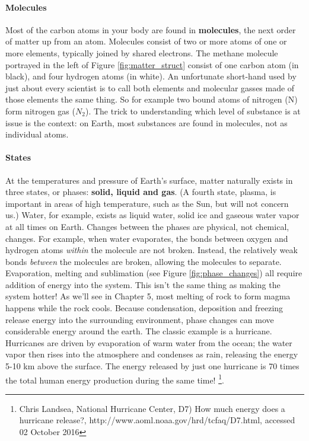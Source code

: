 \documentclass[amstex,12pt]{book}
\begin{document}
\paragraph{Molecules}
Most of the carbon atoms in your body are found in \textbf{molecules}, the next order of matter up from an atom. Molecules consist of two or more atoms of one or more elements, typically joined by shared electrons. The methane molecule portrayed in the left of Figure \ref{fig:matter_struct} consist of one carbon atom (in black), and four hydrogen atoms (in white). An unfortunate short-hand used by just about every scientist is to call both elements and molecular gasses made of those elements the same thing. So for example two bound atoms of nitrogen (N) form nitrogen gas ($N_{2}$). The trick to understanding which level of substance is at issue is the context: on Earth, most substances are found in molecules, not as individual atoms.

\paragraph{States}
At the temperatures and pressure of Earth's surface, matter naturally exists in three states, or phases: \textbf{solid, liquid and gas}. (A fourth state, plasma, is important in areas of high temperature, such as the Sun, but will not concern us.) Water, for example, exists as liquid water, solid ice and gaseous water vapor at all times on Earth. Changes between the phases are physical, not chemical, changes. For example, when water evaporates, the bonds between oxygen and hydrogen atoms \emph{within} the molecule are not broken. Instead, the relatively weak bonds \emph{between} the molecules are broken, allowing the molecules to separate. Evaporation, melting and sublimation (see Figure \ref{fig:phase_changes}) all require addition of energy into the system. This isn't the same thing as making the system hotter! As we'll see in Chapter 5, most melting of rock to form magma happens while the rock cools. Because condensation, deposition and freezing release energy into the surrounding environment, phase changes can move considerable energy around the earth. The classic example is a hurricane. Hurricanes are driven by evaporation of warm water from the ocean; the water vapor then rises into the atmosphere and condenses as rain, releasing the energy 5-10 km above the surface. The energy released by just one hurricane is 70 times the total human energy production during the same time! \footnote{Chris Landsea, National  Hurricane Center,  D7) How much energy does a hurricane release?, http://www.aoml.noaa.gov/hrd/tcfaq/D7.html, accessed 02 October 2016}.
\end{document}
